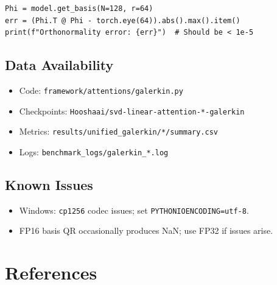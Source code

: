 \begin{lstlisting}
Phi = model.get_basis(N=128, r=64)
err = (Phi.T @ Phi - torch.eye(64)).abs().max().item()
print(f"Orthonormality error: {err}")  # Should be < 1e-5
\end{lstlisting}

\subsection{Data Availability}

\begin{itemize}
\item Code: \texttt{framework/attentions/galerkin.py}
\item Checkpoints: \texttt{Hooshaai/svd-linear-attention-*-galerkin}
\item Metrics: \texttt{results/unified\_galerkin/*/summary.csv}
\item Logs: \texttt{benchmark\_logs/galerkin\_*.log}

\end{itemize}
\subsection{Known Issues}

\begin{itemize}
\item Windows: \texttt{cp1256} codec issues; set \texttt{PYTHONIOENCODING=utf-8}.
\item FP16 basis QR occasionally produces NaN; use FP32 if issues arise.

\end{itemize}



\section{References}


